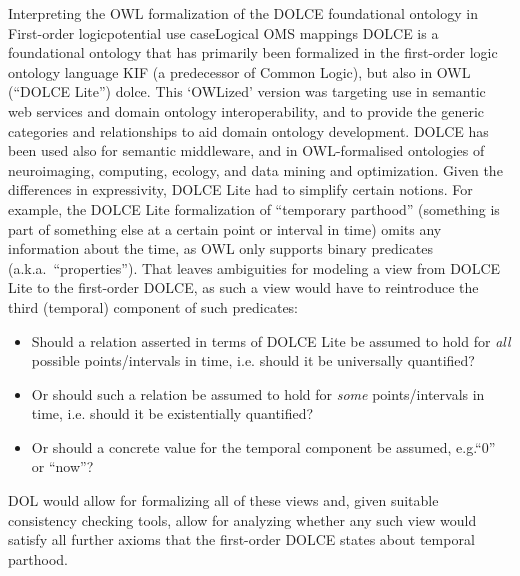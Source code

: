 \documentclass[10pt,%
\ifpretendfinal
final%
\else
draft%
\fi,
]{scrreprt}
\makeatletter
\newcommand*{\eg}{e.g.\@\xspace}
\newcommand*{\ie}{i.e.\@\xspace}
\newcommand{\bref}[1]{[\ref{#1}]}
\renewcommand{\bref}[1]{#1}
\makeatother
\begin{document}
\begin{usecase}{Interpreting the OWL formalization of the DOLCE foundational ontology in First-order logic}{potential use case}{Logical OMS mappings}
  DOLCE is a foundational ontology that has primarily been formalized in the first-order logic ontology language KIF (a predecessor of Common Logic), but also in OWL (``DOLCE Lite'') \bref{dolce}. This ‘OWLized’ version was targeting use in semantic web services and domain ontology interoperability, and to provide the generic categories and relationships to aid domain ontology development. DOLCE has been used also for semantic middleware, and in OWL-formalised ontologies of neuroimaging, computing, ecology, and data mining and optimization.
  Given the differences in expressivity, DOLCE Lite had to simplify certain notions.  For example, the DOLCE Lite formalization of ``temporary parthood'' (something is part of something else at a certain point or interval in time) omits any information about the time, as OWL only supports binary predicates (a.k.a.\ ``properties'').  That leaves ambiguities for modeling a view from DOLCE Lite to the first-order DOLCE, as such a view would have to reintroduce the third (temporal) component of such predicates:
  \begin{itemize}
  \item Should a relation asserted in terms of DOLCE Lite be assumed to hold for \emph{all} possible points/intervals in time, \ie should it be universally quantified?
  \item Or should such a relation be assumed to hold for \emph{some} points/intervals in time, \ie should it be existentially quantified?
  \item Or should a concrete value for the temporal component be assumed, \eg ``0'' or ``now''?
  \end{itemize}
  
  DOL would allow for formalizing all of these views and, given suitable consistency checking tools, allow for analyzing whether any such view would satisfy all further axioms that the first-order DOLCE states about temporal parthood.
\end{usecase}
\end{document}
